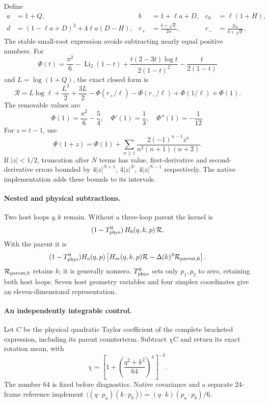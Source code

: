 \documentclass[11pt]{article}
\begin{document}
Define
\begin{align*}
 a&=1+Q,& b&=1+\ell a+D,& c_0&=\ell(1+H),\\
 d&=(1-\ell a+D)^2+4\ell a(D-H),&
 r_+&=\frac{b+\sqrt d}{2a},&
 r_-&=\frac{2c_0}{b+\sqrt d}.
\end{align*}
The stable small-root expression avoids subtracting nearly equal positive numbers.
For
\[
 \Phi(t)=\frac{\pi^2}{6}-\operatorname{Li}_2(1-t)
 +\frac{t(2-3t)\log t}{2(1-t)^2}-\frac{t}{2(1-t)}
\]
and $L=\log(1+Q)$, the exact closed form is
\begin{equation}
 \mathcal R=L\log\ell+\frac{L^2}{2}+\frac{3L}{2}
 -\Phi(r_+/\ell)-\Phi(r_-/\ell)+\Phi(1/\ell)+\Phi(1).
\end{equation}
The removable values are
\[
 \Phi(1)=\frac{\pi^2}{6}-\frac54,\quad
 \Phi'(1)=\frac13,\quad \Phi''(1)=-\frac1{12}.
\]
For $z=t-1$, use
\[
 \Phi(1+z)=\Phi(1)+
 \sum_{n\ge1}\frac{2(-1)^{n-1}z^n}{n^2(n+1)(n+2)}.
\]
If $|z|<1/2$, truncation after $N$ terms has value, first-derivative and second-derivative errors bounded by
$4|z|^{N+1}$, $4|z|^N$, $4|z|^{N-1}$ respectively.
The native implementation adds these bounds to its intervals.

\paragraph{Nested and physical subtractions.}
Two host loops $q,k$ remain. Without a three-loop parent the kernel is
\[
 (1-T^0_{\rm phys})\,H_6(q,k,p)\,\mathcal R.
\]
With the parent it is
\[
 (1-T^0_{\rm phys})H_o(q,p)
 \left[H_m(q,k,p)\mathcal R-\Delta(k)^3\mathcal R_{\rm parent,0}\right].
\]
$\mathcal R_{\rm parent,0}$ retains $k$; it is generally nonzero.
$T^0_{\rm phys}$ sets only $p_1,p_2$ to zero, retaining both host loops.
Seven host geometry variables and four simplex coordinates give an eleven-dimensional representation.

\paragraph{An independently integrable control.}
Let $C$ be the physical quadratic Taylor coefficient of the complete bracketed expression, including its parent counterterm. Subtract $\chi C$ and return its exact rotation mean, with
\[
 \chi=\left[1+\left(\frac{q^2+k^2}{64}\right)^4\right]^{-3}.
\]
The number 64 is fixed before diagnostics.
Native covariance and a separate 24-frame reference implement
$\langle(q\cdot p_a)(k\cdot p_b)\rangle=(q\cdot k)(p_a\cdot p_b)/6$.
\end{document}
